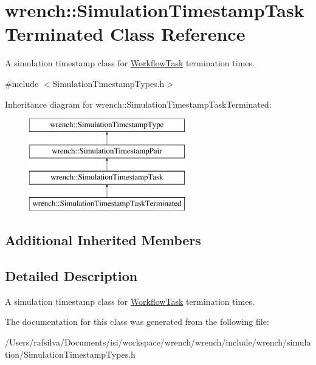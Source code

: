 \hypertarget{classwrench_1_1_simulation_timestamp_task_terminated}{}\section{wrench\+:\+:Simulation\+Timestamp\+Task\+Terminated Class Reference}
\label{classwrench_1_1_simulation_timestamp_task_terminated}


A simulation timestamp class for \hyperlink{classwrench_1_1_workflow_task}{Workflow\+Task} termination times.  




{\ttfamily \#include $<$Simulation\+Timestamp\+Types.\+h$>$}

Inheritance diagram for wrench\+:\+:Simulation\+Timestamp\+Task\+Terminated\+:\begin{figure}[H]
\begin{center}
\leavevmode
\includegraphics[height=4.000000cm]{classwrench_1_1_simulation_timestamp_task_terminated}
\end{center}
\end{figure}
\subsection*{Additional Inherited Members}


\subsection{Detailed Description}
A simulation timestamp class for \hyperlink{classwrench_1_1_workflow_task}{Workflow\+Task} termination times. 

The documentation for this class was generated from the following file\+:\begin{DoxyCompactItemize}
\item 
/\+Users/rafsilva/\+Documents/isi/workspace/wrench/wrench/include/wrench/simulation/Simulation\+Timestamp\+Types.\+h\end{DoxyCompactItemize}

